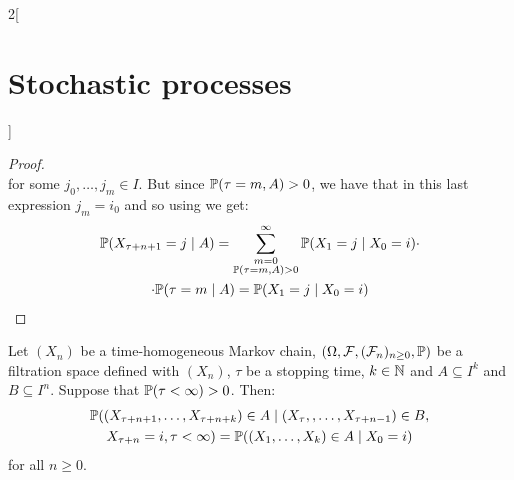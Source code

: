 \documentclass[../../../main_math.tex]{subfiles}
\begin{document}
\begin{multicols}{2}[\section{Stochastic processes}]
\begin{proof}
\begin{equation*}
    \end{equation*}
    for some $j_0,\ldots,j_m\in I$. But since $\mathbb{P}(\tau=m,A)>0$, we have that in this last expression $j_m=i_0$ and so using  we get:
    \begin{multline*}
      \mathbb{P}(X_{\tau+n+1}=j\mid A) =\sum_{\substack{m=0 \\\mathbb{P}(\tau=m,A)>0}}^{\infty}\mathbb{P}(X_1=j\mid X_0=i)\cdot\\\cdot\mathbb{P}(\tau=m\mid A)=\mathbb{P}(X_1=j\mid X_0=i)
    \end{multline*}
  \end{proof}
  \begin{corollary}\label{SP:MarkovStrong2}
    Let $(X_n)$ be a time-homogeneous Markov chain, $(\Omega,\mathcal{F},(\mathcal{F}_n)_{n\geq 0},\mathbb{P})$ be a filtration space defined with $(X_n)$, $\tau$ be a stopping time, $k\in\mathbb{N}$ and $A\subseteq I^k$ and $B\subseteq I^n$. Suppose that $\mathbb{P}(\tau<\infty)>0$. Then:
    \begin{multline*}
      \mathbb{P}((X_{\tau+n+1},\ldots,X_{\tau+n+k})\in A\mid (X_{\tau},,\ldots,X_{\tau+n-1})\in B, \\X_{\tau +n}=i,\tau<\infty)=\mathbb{P}((X_{1},\ldots,X_{k})\in A\mid X_0=i)
    \end{multline*}
    for all $n\geq 0$.
  \end{corollary}

\end{multicols}
\end{document}

